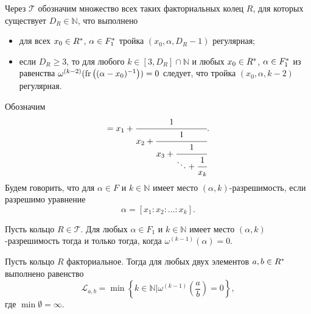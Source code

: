 \documentclass[_00_autoref.tex]{subfiles}
\begin{document}
\begin{definition}
    Через $\mathcal{T}$ обозначим множество всех таких факториальных колец $R$, для которых существует $D_R \in \mathbb{N}$, что выполнено
    \begin{itemize}
        \item для всех $x_0 \in R^{*}$, $\alpha \in F_1^{*}$ тройка $(x_0, \alpha, D_R - 1)$ регулярная;

        \item если $D_R \ge 3$, то для любого $k \in [3, D_R] \cap \mathbb{N}$ и любых $x_0 \in R^{*}$, $\alpha \in F_1^{*}$ из равенства $\omega^{(k-2)}(\textrm{fr}\left((\alpha - x_0)^{-1}\right)) = 0$ следует, что тройка $(x_0, \alpha, k-2)$ регулярная.
    \end{itemize}
\end{definition}

\begin{definition}
    Обозначим
    \begin{equation*}
        [x_1: x_2: \dots: x_k] = x_{1} + \cfrac{1}{
            x_{2} + \cfrac{1}{
                x_{3} + \cfrac{1}{
                    \ddots + \cfrac{1}{
                        x_{k}
                    }
                }
            }
        }.
    \end{equation*}
    Будем говорить, что для $\alpha \in F$ и $k \in \mathbb{N}$ имеет место $(\alpha, k)$-разрешимость, если разрешимо уравнение
    \begin{equation*}
        \alpha = [x_1: x_2: \dots: x_k].
    \end{equation*}
\end{definition}

\begin{lemma}\label{lemma:omega_and_euclidean_algorithm}
    Пусть кольцо $R \in \mathcal{T}$.
    Для любых $\alpha \in F_1$ и $k \in \mathbb{N}$ имеет место $(\alpha, k)$-разрешимость тогда и только тогда, когда $\omega^{(k-1)}(\alpha) = 0$.
\end{lemma}

\begin{lemma}\label{lemma:euclidean_algorithm_and_minima}
    Пусть кольцо $R$ факториальное.
    Тогда для любых двух элементов $a, b \in R^{*}$ выполнено равенство
    \begin{equation*}
        \mathcal{L}_{a, b} = \min\left\{
            k \in \mathbb{N} \big| \omega^{(k-1)}\left(\frac{a}{b}\right) = 0
        \right\},
    \end{equation*}
    где $\min \emptyset = \infty$.
\end{lemma}
\end{document}
